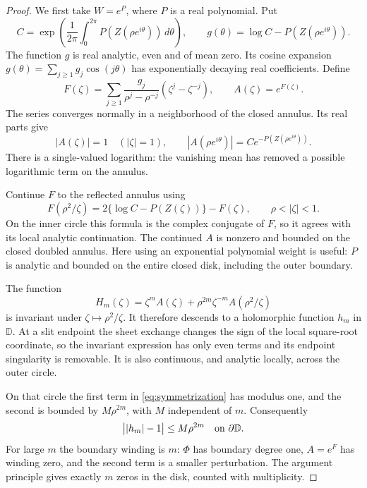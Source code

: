 \documentclass[11pt]{article}
\newcommand{\D}{\mathbb D}
\begin{document}
\begin{proof}
We first take $W=e^P$, where $P$ is a real polynomial. Put
\[
 C=\exp\left(\frac1{2\pi}\int_0^{2\pi}
 P(Z(\rho e^{i\theta}))\,d\theta\right),\qquad
 g(\theta)=\log C-P(Z(\rho e^{i\theta})).
\]
The function $g$ is real analytic, even and of mean zero.
Its cosine expansion $g(\theta)=\sum_{j\ge1}g_j\cos(j\theta)$ has
exponentially decaying real coefficients. Define
\begin{equation}\label{eq:compensator}
 F(\zeta)=\sum_{j\ge1}\frac{g_j}{\rho^j-\rho^{-j}}
                  (\zeta^j-\zeta^{-j}),\qquad A(\zeta)=e^{F(\zeta)}.
\end{equation}
The series converges normally in a neighborhood of the closed annulus.
Its real parts give
\begin{equation}\label{eq:factor-moduli}
 |A(\zeta)|=1\quad(|\zeta|=1),\qquad
 |A(\rho e^{i\theta})|=C e^{-P(Z(\rho e^{i\theta}))}.
\end{equation}
There is a single-valued logarithm: the vanishing mean has removed a
possible logarithmic term on the annulus.

Continue $F$ to the reflected annulus using
\begin{equation}\label{eq:factor-reflection}
 F(\rho^2/\zeta)=2\{\log C-P(Z(\zeta))\}-F(\zeta),
                  \qquad \rho<|\zeta|<1.
\end{equation}
On the inner circle this formula is the complex conjugate of $F$, so it
agrees with its local analytic continuation. The continued $A$ is
nonzero and bounded on the closed doubled annulus. Here using an
exponential polynomial weight is useful: $P$ is analytic and bounded on
the entire closed disk, including the outer boundary.

The function
\begin{equation}\label{eq:symmetrization}
 H_m(\zeta)=\zeta^m A(\zeta)
       +\rho^{2m}\zeta^{-m}A(\rho^2/\zeta)
\end{equation}
is invariant under $\zeta\mapsto\rho^2/\zeta$.
It therefore descends to a holomorphic function $h_m$ in $\D$.
At a slit endpoint the sheet exchange changes the sign of the local
square-root coordinate, so the invariant expression has only even terms
and its endpoint singularity is removable. It is also continuous, and
analytic locally, across the outer circle.

On that circle the first term in \eqref{eq:symmetrization} has modulus one,
and the second is bounded by $M\rho^{2m}$, with $M$ independent of $m$.
Consequently
\begin{equation}\label{eq:outer-bound}
 \big||h_m|-1\big|\le M\rho^{2m}\quad\hbox{on }\partial\D.
\end{equation}
For large $m$ the boundary winding is $m$: $\Phi$ has boundary degree one,
$A=e^F$ has winding zero, and the second term is a smaller perturbation.
The argument principle gives exactly $m$ zeros in the disk, counted with
multiplicity.


\end{proof}
\end{document}
